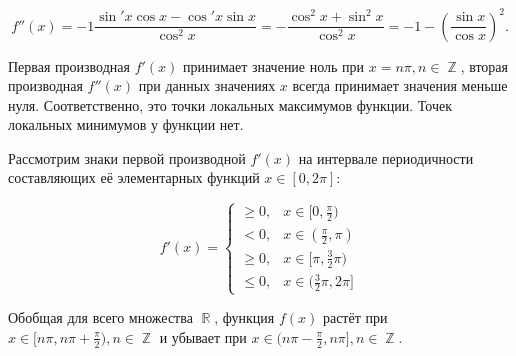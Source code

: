 \documentclass[a4paper,11pt]{article}
\DeclareMathOperator*{\R}{\mathbb{R}}   %
\DeclareMathOperator*{\Z}{\mathbb{Z}}   %
\begin{document}
\begin{equation*}
\label{eq:task8_der2}
f''(x) = -1 \frac{\sin' x \cos x - \cos' x \sin x}{\cos^2 x} = -\frac{\cos^2 x + \sin^2 x}{\cos^2 x} = -1 - (\frac{\sin x}{\cos x})^2.
\end{equation*}

Первая производная $f'(x)$ принимает значение ноль при $x = n \pi, n \in \Z$, вторая производная $f''(x)$ при данных значениях $x$ всегда принимает значения меньше нуля. Соответственно, это точки локальных максимумов функции. Точек локальных минимумов у функции нет.

Рассмотрим знаки первой производной $f'(x)$ на интервале периодичности составляющих её элементарных функций $x \in [0, 2\pi]$:

\begin{equation*}
  f'(x) = 
  \begin{cases}
    \geq 0, & x \in [0, \frac{\pi}{2}) \\
    < 0, & x \in (\frac{\pi}{2}, \pi) \\
    \geq 0, & x \in [\pi, \frac{3}{2}\pi) \\
    \leq 0, & x \in (\frac{3}{2}\pi, 2\pi]
  \end{cases}
\end{equation*}

Обобщая для всего множества $\R$, функция $f(x)$ растёт при $x \in [n \pi, n \pi + \frac{\pi}{2}), n \in \Z$ и убывает при $x \in (n \pi - \frac{\pi}{2}, n \pi], n \in \Z$.

\end{document}
